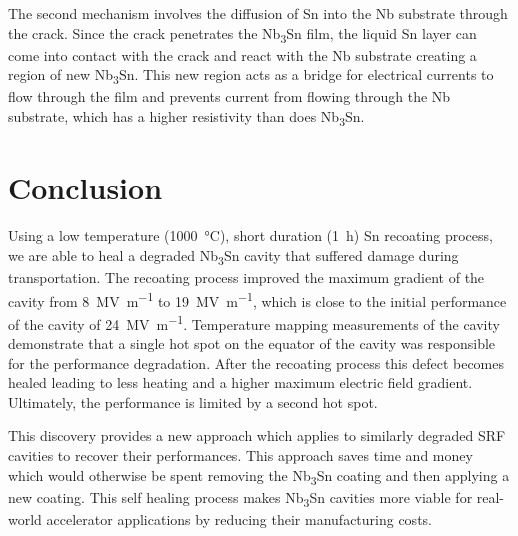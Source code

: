 The second mechanism involves the diffusion of Sn into the Nb substrate through the crack. Since the crack penetrates the Nb\textsubscript{3}Sn film, the liquid Sn layer can come into contact with the crack and react with the Nb substrate creating a region of new Nb\textsubscript{3}Sn. This new region acts as a bridge for electrical currents to flow through the film and prevents current from flowing through the Nb substrate, which has a higher resistivity than does Nb\textsubscript{3}Sn. 


\section{Conclusion}
\label{sec:Conclusion}

Using a low temperature (\qty{1000}{\degreeCelsius}), short duration (\qty{1}{\hour}) Sn recoating process, we are able to heal a degraded Nb\textsubscript{3}Sn cavity that suffered damage during transportation. The recoating process improved the maximum gradient of the cavity from \qty{8}{\mega\volt\per\meter} to \qty{19}{\mega\volt\per\meter}, which is close to the initial performance of the cavity of \qty{24}{\mega\volt\per\meter}. Temperature mapping measurements of the cavity demonstrate that a single hot spot on the equator of the cavity was responsible for the performance degradation. After the recoating process this defect becomes healed leading to less heating and a higher maximum electric field gradient. Ultimately, the performance is limited by a second hot spot.

This discovery provides a new approach which applies to similarly degraded SRF cavities to recover their performances. This approach saves time and money which would otherwise be spent removing the Nb\textsubscript{3}Sn coating and then applying a new coating. This self healing process makes Nb\textsubscript{3}Sn cavities more viable for real-world accelerator applications by reducing their manufacturing costs.
